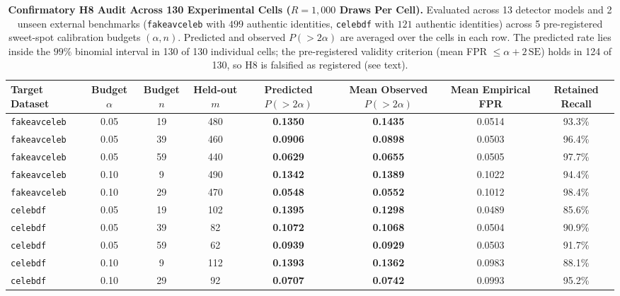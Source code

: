 \begin{table}[t]
\centering
\small
\caption{\textbf{Confirmatory H8 Audit Across 130 Experimental Cells ($R=1{,}000$ Draws Per Cell).} Evaluated across 13 detector models and 2 unseen external benchmarks (\texttt{fakeavceleb} with $499$ authentic identities, \texttt{celebdf} with $121$ authentic identities) across 5 pre-registered sweet-spot calibration budgets $(\alpha, n)$. Predicted and observed $P(>2\alpha)$ are averaged over the cells in each row. The predicted rate lies inside the $99\%$ binomial interval in 130 of 130 individual cells; the pre-registered validity criterion (mean FPR $\le \alpha + 2\,\mathrm{SE}$) holds in 124 of 130, so H8 is falsified as registered (see text).}
\label{tab:h8_summary}
\begin{tabular}{l c c c c c c c}
\toprule
\textbf{Target Dataset} & \textbf{Budget $\alpha$} & \textbf{Budget $n$} & \textbf{Held-out $m$} & \textbf{Predicted $P(>2\alpha)$} & \textbf{Mean Observed $P(>2\alpha)$} & \textbf{Mean Empirical FPR} & \textbf{Retained Recall} \\
\midrule
\texttt{fakeavceleb} & 0.05 & 19 & 480 & \textbf{0.1350} & \textbf{0.1435} & 0.0514 & 93.3\% \\
\texttt{fakeavceleb} & 0.05 & 39 & 460 & \textbf{0.0906} & \textbf{0.0898} & 0.0503 & 96.4\% \\
\texttt{fakeavceleb} & 0.05 & 59 & 440 & \textbf{0.0629} & \textbf{0.0655} & 0.0505 & 97.7\% \\
\texttt{fakeavceleb} & 0.10 &  9 & 490 & \textbf{0.1342} & \textbf{0.1389} & 0.1022 & 94.4\% \\
\texttt{fakeavceleb} & 0.10 & 29 & 470 & \textbf{0.0548} & \textbf{0.0552} & 0.1012 & 98.4\% \\
\midrule
\texttt{celebdf}     & 0.05 & 19 & 102 & \textbf{0.1395} & \textbf{0.1298} & 0.0489 & 85.6\% \\
\texttt{celebdf}     & 0.05 & 39 &  82 & \textbf{0.1072} & \textbf{0.1068} & 0.0504 & 90.9\% \\
\texttt{celebdf}     & 0.05 & 59 &  62 & \textbf{0.0939} & \textbf{0.0929} & 0.0503 & 91.7\% \\
\texttt{celebdf}     & 0.10 &  9 & 112 & \textbf{0.1393} & \textbf{0.1362} & 0.0983 & 88.1\% \\
\texttt{celebdf}     & 0.10 & 29 &  92 & \textbf{0.0707} & \textbf{0.0742} & 0.0993 & 95.2\% \\
\bottomrule
\end{tabular}
\end{table}

